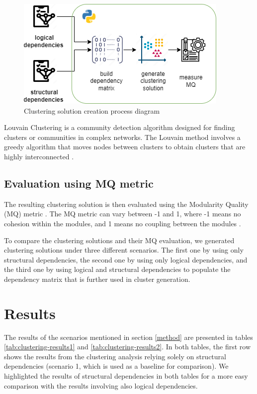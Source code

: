 \documentclass[conference]{IEEEtran}
\begin{document}
\begin{figure}[H]
\centering
\includegraphics[width=\columnwidth]{clustering-generation.png}
\caption{Clustering solution creation process diagram}
\label{fig:clustering-gen}
\end{figure}

Louvain Clustering is a community detection algorithm designed for finding clusters or communities in complex networks. The Louvain method involves a greedy algorithm that moves nodes between clusters to obtain clusters that are highly interconnected \cite{louvain_clustering}.

\subsection{Evaluation using MQ metric}
The resulting clustering solution is then evaluated using the Modularity Quality (MQ) metric . The MQ metric can vary between -1 and 1, where -1 means no cohesion within the modules, and 1 means no coupling between the modules \cite{mqmetric}.

To compare the clustering solutions and their MQ evaluation, we generated clustering solutions under three different scenarios. The first one by using only structural dependencies, the second one by using only logical dependencies, and the third one by using logical and structural dependencies to populate the dependency matrix that is further used in cluster generation.


\section{Results}
\label{results}


The results of the scenarios mentioned in section \ref{method} are presented in tables \ref{tab:clustering-results1} and \ref{tab:clustering-results2}.
 In both tables, the first row shows the results from the clustering analysis relying solely on structural dependencies (scenario 1, which is used as a baseline for comparison). We highlighted the results of structural dependencies in both tables for a more easy comparison with the results involving also logical dependencies.
\end{document}
